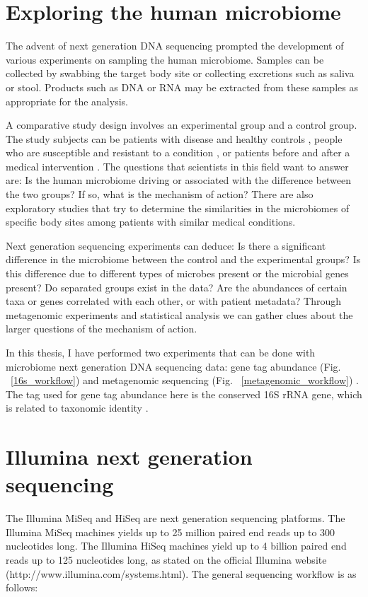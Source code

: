 \section{Exploring the human microbiome}
The advent of next generation DNA sequencing prompted the development of various experiments on sampling the human microbiome. Samples can be collected by swabbing the target body site or collecting excretions such as saliva or stool. Products such as DNA or RNA may be extracted from these samples as appropriate for the analysis.

A comparative study design involves an experimental group and a control group. The study subjects can be patients with disease and healthy controls \cite{macklaim2013comparative}, people who are susceptible and resistant to a condition \cite{theriot2014antibiotic}, or patients before and after a medical intervention \cite{graessler2013metagenomic}. The questions that scientists in this field want to answer are: Is the human microbiome driving or associated with the difference between the two groups? If so, what is the mechanism of action? There are also exploratory studies that try to determine the similarities in the microbiomes of specific body sites among patients with similar medical conditions.

Next generation sequencing experiments can deduce: Is there a significant difference in the microbiome between the control and the experimental groups? Is this difference due to different types of microbes present or the microbial genes present? Do separated groups exist in the data? Are the abundances of certain taxa or genes correlated with each other, or with patient metadata? Through metagenomic experiments and statistical analysis we can gather clues about the larger questions of the mechanism of action.

In this thesis, I have performed two experiments that can be done with microbiome next generation DNA sequencing data: gene tag abundance (Fig. ~\ref{16s_workflow}) and metagenomic sequencing (Fig. ~\ref{metagenomic_workflow}) \cite{riesenfeld2004metagenomics}. The tag used for gene tag abundance here is the conserved 16S rRNA gene, which is related to taxonomic identity \cite{gloor2010microbiome}.

\section{Illumina next generation sequencing}
The Illumina MiSeq and HiSeq are next generation sequencing platforms. The Illumina MiSeq machines yields up to 25 million paired end reads up to 300 nucleotides long. The Illumina HiSeq machines yield up to 4 billion paired end reads up to 125 nucleotides long, as stated on the official Illumina website (http://www.illumina.com/systems.html). The general sequencing workflow is as follows:

